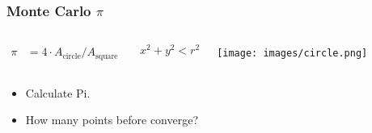\begin{frame}[fragile]


    \frametitle{Monte Carlo $\pi$}

    \begin{columns}[c]


            \begin{align*}
                \pi &= 4 \cdot A_\text{circle} / A_\text{square}
            \end{align*}

            \begin{equation*}
                x^2 + y^2 < r^2
            \end{equation*}


            \texttt{[image: images/circle.png]}

    \end{columns}

        \begin{itemize}
            \item Calculate Pi.
            \item How many points before converge?
        \end{itemize}



\end{frame}

